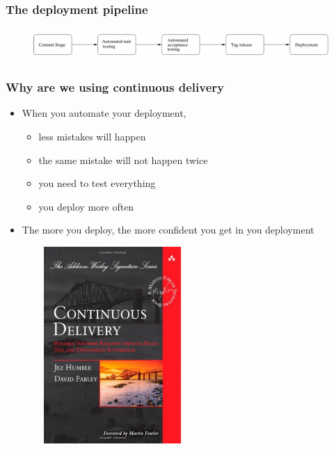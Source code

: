 \documentclass{beamer}
\begin{document}
\begin{frame}
  \frametitle{The deployment pipeline}
  \begin{figure}[ht]
    \centering
      \includegraphics[height=1.2cm,width=11.5cm]{../pics/deployment_pipline}
    \label{fig:stack}
  \end{figure}
\end{frame}

\begin{frame}
  \frametitle{Why are we using continuous delivery}

  \begin{itemize}
  \item<1-> When you automate your deployment,
    \begin{itemize}
    \item<2->less mistakes will happen
    \item<3-> the same mistake will not happen twice
    \item<4-> you need to test everything
    \item<5->you deploy more often
    \end{itemize}
  \item<6-> The more you deploy, the more confident you get in you deployment
  \end{itemize}
\end{frame}

\begin{frame}
  \begin{figure}[ht]
    \centering
      \includegraphics[height=7.5cm,width=6cm]{../pics/cd_book}
    \label{fig:stack}
  \end{figure}
\end{frame}
\end{document}
